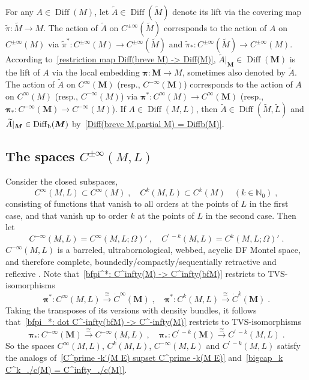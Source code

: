 \documentclass{memo-l}
\theoremstyle{plain}
\theoremstyle{definition}
\theoremstyle{remark}
\newcommand{\N}{\mathbb{N}}
\newcommand{\bfM}{\boldsymbol{M}}
\newcommand{\bfpi}{\boldsymbol{\pi}}
\newcommand{\Diff}{\operatorname{Diff}}
\newcommand{\Diffb}{\Diff_{\text{\rm b}}}
\numberwithin{section}{chapter}
\numberwithin{equation}{section}%
\begin{document}
For any $A\in\Diff(M)$, let $\widetilde A\in\Diff(\widetilde M)$ denote its lift via the covering map $\tilde\pi:\widetilde M\to M$.  The action of $\widetilde A$ on $C^{\pm\infty}(\widetilde M)$ corresponds to the action of $A$ on $C^{\pm\infty}(M)$ via $\tilde\pi^*:C^{\pm\infty}(M)\to C^{\pm\infty}(\widetilde M)$ and $\tilde\pi_*:C^{\pm\infty}(\widetilde M)\to C^{\pm\infty}(M)$. According to~\eqref{restriction map Diff(breve M) -> Diff(M)}, $\widetilde A|_{\bfM}\in\Diff(\bfM)$ is the lift of $A$ via the local embedding $\bfpi:\bfM\to M$, sometimes also denoted by $\widetilde A$.  The action of $\widetilde A$ on $C^\infty(\bfM)$ (resp., $C^{-\infty}(\bfM)$) corresponds to the action of $A$ on $C^\infty(M)$ (resp., $C^{-\infty}(M)$) via $\bfpi^*:C^\infty(M)\to C^\infty(\bfM)$ (resp., $\bfpi_*:C^{-\infty}(\bfM)\to C^{-\infty}(M)$). If $A\in\Diff(M,L)$, then $\widetilde A\in\Diff(\widetilde M,\widetilde L)$ and $\widetilde A|_{\bfM}\in\Diffb(\bfM)$ by~\eqref{Diff(breve M,partial M) = Diffb(M)}.


\subsection{The spaces $C^{\pm\infty}(M,L)$}\label{ss: C^-infty(M L)}

Consider the closed subspaces,  
\begin{equation}\label{C^infty(M L) subset C^infty(M)}
C^\infty(M,L)\subset C^\infty(M)\;,\quad C^k(M,L)\subset C^k(M)\quad(k\in\N_0)\;,
\end{equation}
consisting of functions that vanish to all orders at the points of $L$ in the first case, and that vanish up to order $k$ at the points of $L$ in the second case. Then let  
\[
C^{-\infty}(M,L)=C^\infty(M,L;\Omega)'\;,\quad C^{\prime\,-k}(M,L)=C^k(M,L;\Omega)'\;.
\]
$C^{-\infty}(M,L)$ is a barreled, ultrabornological, webbed, acyclic DF Montel space, and therefore complete, boundedly/compactly/sequentially retractive and reflexive \cite[Corollary~7.1]{AlvKordyLeichtnam-conormal}. Note that~\eqref{bfpi^*: C^infty(M) -> C^infty(bfM)} restricts to TVS-isomorphisms
\begin{equation}\label{bfpi^*: C^infty(M L) cong dot C^infty(bfM)}
\bfpi^*:C^\infty(M,L)\xrightarrow{\cong}\dot C^\infty(\bfM)\;,\quad
\bfpi^*:C^k(M,L)\xrightarrow{\cong}\dot C^k(\bfM)\;.
\end{equation}
Taking the transposes of its versions with density bundles, it follows that~\eqref{bfpi_*: dot C^-infty(bfM) -> C^-infty(M)} restricts to TVS-isomorphisms
\begin{equation}\label{bfpi_*: C^-infty(bfM) cong C^-infty(M L)}
\bfpi_*:C^{-\infty}(\bfM)\xrightarrow{\cong}C^{-\infty}(M,L)\;,\quad
\bfpi_*:C^{\prime\,-k}(\bfM)\xrightarrow{\cong}C^{\prime\,-k}(M,L)\;.
\end{equation}
So the spaces $C^\infty(M,L)$, $C^k(M,L)$, $C^{-\infty}(M,L)$ and $C^{\prime\,-k}(M,L)$ satisfy the analogs of~\eqref{C^prime -k'(M E) supset C^prime -k(M E)} and~\eqref{bigcap_k C^k_./c(M) = C^infty_./c(M)}.
\end{document}

